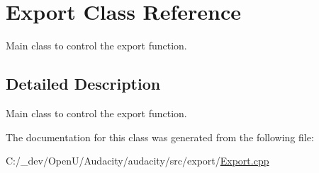 \hypertarget{class_export}{}\section{Export Class Reference}
\label{class_export}


Main class to control the export function.  




\subsection{Detailed Description}
Main class to control the export function. 

The documentation for this class was generated from the following file\+:\begin{DoxyCompactItemize}
\item 
C\+:/\+\_\+dev/\+Open\+U/\+Audacity/audacity/src/export/\hyperlink{_export_8cpp}{Export.\+cpp}\end{DoxyCompactItemize}
